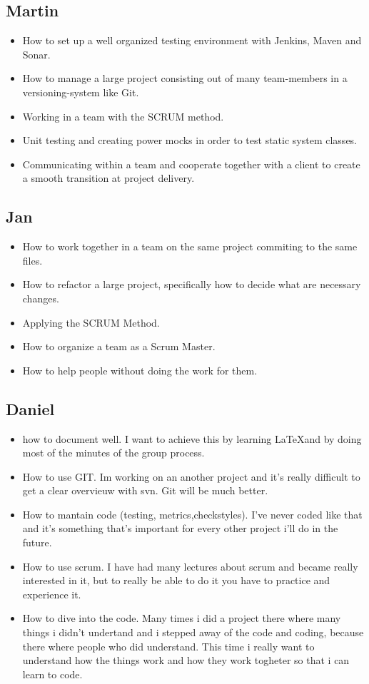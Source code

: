 \documentclass{article}
\begin{document}
\subsection*{Martin}
\begin{itemize}
  \item How to set up a well organized testing environment with Jenkins, Maven and Sonar.
  \item How to manage a large project consisting out of many team-members in a versioning-system like Git.
  \item Working in a team with the SCRUM method.
  \item Unit testing and creating power mocks in order to test static system classes.
  \item Communicating within a team and cooperate together with a client to create a smooth transition at project delivery.
\end{itemize}
\subsection*{Jan}
\begin{itemize}
	\item How to work together in a team on the same project commiting to the same files.
	\item How to refactor a large project, specifically how to decide what are necessary changes.
	\item Applying the SCRUM Method.
	\item How to organize a team as a Scrum Master.
	\item How to help people without doing the work for them.
\end{itemize}
\subsection*{Daniel} 
\begin{itemize}
	\item how to document well. I want to achieve this by learning \LaTeX  and by doing most of the  minutes of the group process. 
	\item How to use GIT. Im working on an another project and it's really difficult to get a clear overvieuw with svn. Git will be much better. 
	\item How to mantain code (testing, metrics,checkstyles). I've never coded like that and it's something that's important for every other project i'll do in the future. 
	\item How to use scrum. I have had many lectures about scrum and became really interested in it, but to really be able to do it you have to practice and experience it. 
	\item How to dive into the code. Many times i did a project there where many things i didn't undertand and i stepped away of the code and coding, because there where people who did understand. This time i really want to understand how the things work and how they work togheter so that i can learn to code.  
\end{itemize}
\end{document}
